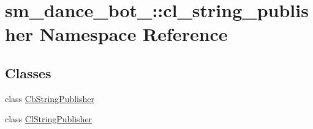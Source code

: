 \hypertarget{namespacesm__dance__bot__2_1_1cl__string__publisher}{}\section{sm\+\_\+dance\+\_\+bot\+\_\+:\+:cl\+\_\+string\+\_\+publisher Namespace Reference}
\label{namespacesm__dance__bot__2_1_1cl__string__publisher}
\subsection*{Classes}
\begin{DoxyCompactItemize}
\item 
class \hyperlink{classsm__dance__bot__2_1_1cl__string__publisher_1_1CbStringPublisher}{Cb\+String\+Publisher}
\item 
class \hyperlink{classsm__dance__bot__2_1_1cl__string__publisher_1_1ClStringPublisher}{Cl\+String\+Publisher}
\end{DoxyCompactItemize}
